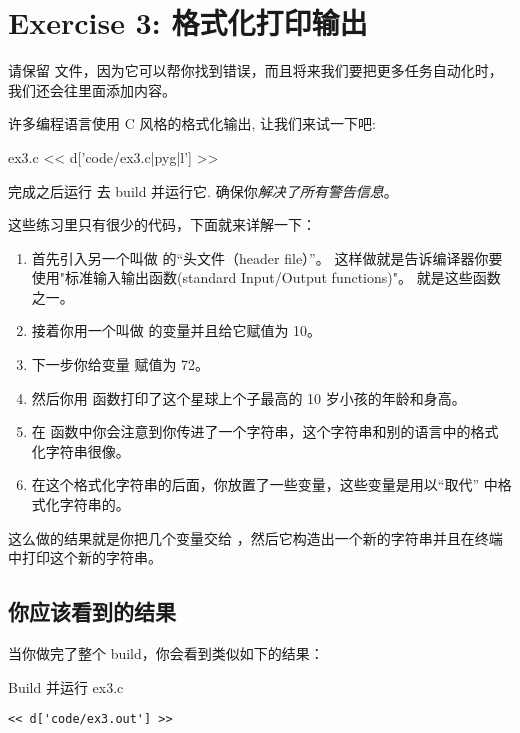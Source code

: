 \chapter{Exercise 3: 格式化打印输出}

请保留   文件，因为它可以帮你找到错误，而且将来我们要把更多任务自动化时，我们还会往里面添加内容。

许多编程语言使用 C 风格的格式化输出, 让我们来试一下吧:

\begin{code}{ex3.c}
<< d['code/ex3.c|pyg|l'] >>
\end{code}

完成之后运行  去 build 并运行它. 
确保你\emph{解决了所有警告信息}。

这些练习里只有很少的代码，下面就来详解一下：

\begin{enumerate}
\item 首先引入另一个叫做  的“头文件（header file）”。 这样做就是告诉编译器你要使用"标准输入输出函数(standard Input/Output functions)"。 就是这些函数之一。
\item 接着你用一个叫做  的变量并且给它赋值为 10。
\item 下一步你给变量  赋值为 72。
\item 然后你用  函数打印了这个星球上个子最高的 10  岁小孩的年龄和身高。
\item 在  函数中你会注意到你传进了一个字符串，这个字符串和别的语言中的格式化字符串很像。
\item 在这个格式化字符串的后面，你放置了一些变量，这些变量是用以“取代”  中格式化字符串的。
\end{enumerate}

这么做的结果就是你把几个变量交给 ，然后它构造出一个新的字符串并且在终端中打印这个新的字符串。

\section{你应该看到的结果}

当你做完了整个 build，你会看到类似如下的结果：

\begin{Terminal}{Build 并运行 ex3.c}
\begin{lstlisting}
<< d['code/ex3.out'] >>
\end{lstlisting}
\end{Terminal}

